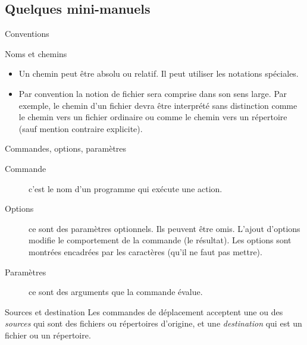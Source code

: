 \subsection{Quelques mini-manuels}
\begin{frame}{Conventions}
  \begin{block}{Noms et chemins}
    \begin{itemize}
    \item Un chemin peut être absolu ou relatif. Il peut utiliser les notations spéciales.
    \item Par convention la notion de fichier sera comprise dans son sens large. Par exemple, le chemin d'un fichier devra être interprété sans distinction comme le chemin vers un fichier ordinaire ou comme le chemin vers un répertoire (sauf mention contraire explicite).
    \end{itemize}
  \end{block}
  \begin{block}{Commandes, options, paramètres}
    \begin{description}
    \item[Commande] c'est le nom d'un programme qui exécute une action.
    \item[Options] ce sont des paramètres optionnels. Ils peuvent être
      omis. L'ajout d'options modifie le comportement de la commande (le
      résultat). Les options sont montrées encadrées par les caractères
      \lin{[ ... ]} (qu'il ne faut pas mettre).
    \item[Paramètres] ce sont des arguments que la commande évalue.
    \end{description}
  \end{block}
  \begin{block}{Sources et destination}
    Les commandes de déplacement acceptent une ou des \emph{sources} qui
    sont des fichiers ou répertoires d'origine, et une
    \emph{destination} qui est un fichier ou un répertoire.
  \end{block}
\end{frame}
